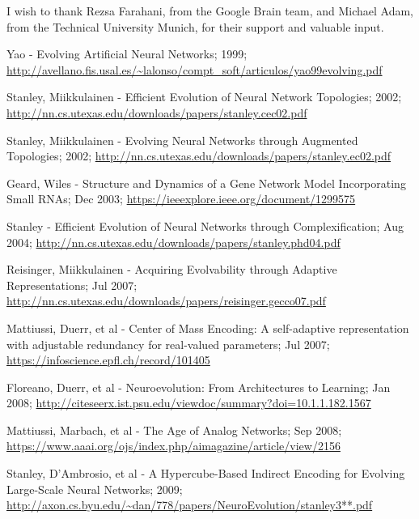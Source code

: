 \documentclass[journal, a4paper]{IEEEtran}
\begin{document}
I wish to thank Rezsa Farahani, from the Google Brain team, and Michael Adam, from the Technical University Munich, for their support and valuable input.




\begin{thebibliography}{5}

    Yao - Evolving Artificial Neural Networks; 1999;
    \url{http://avellano.fis.usal.es/~lalonso/compt_soft/articulos/yao99evolving.pdf}

    Stanley, Miikkulainen - Efficient Evolution of Neural Network Topologies; 2002;
    \url{http://nn.cs.utexas.edu/downloads/papers/stanley.cec02.pdf}

    Stanley, Miikkulainen - Evolving Neural Networks through Augmented Topologies; 2002;
    \url{http://nn.cs.utexas.edu/downloads/papers/stanley.ec02.pdf}

    Geard, Wiles - Structure and Dynamics of a Gene Network Model Incorporating Small RNAs; Dec 2003;
    \url{https://ieeexplore.ieee.org/document/1299575}

    Stanley - Efficient Evolution of Neural Networks through Complexification; Aug 2004;
    \url{http://nn.cs.utexas.edu/downloads/papers/stanley.phd04.pdf}

    Reisinger, Miikkulainen - Acquiring Evolvability through Adaptive Representations; Jul 2007;
    \url{http://nn.cs.utexas.edu/downloads/papers/reisinger.gecco07.pdf}

    Mattiussi, Duerr, et al - Center of Mass Encoding: A self-adaptive representation with adjustable redundancy for real-valued parameters; Jul 2007;
    \url{https://infoscience.epfl.ch/record/101405}

    Floreano, Duerr, et al - Neuroevolution: From Architectures to Learning; Jan 2008;
    \url{http://citeseerx.ist.psu.edu/viewdoc/summary?doi=10.1.1.182.1567}

    Mattiussi, Marbach, et al - The Age of Analog Networks; Sep 2008;
    \url{https://www.aaai.org/ojs/index.php/aimagazine/article/view/2156}

    Stanley, D’Ambrosio, et al - A Hypercube-Based Indirect Encoding for Evolving Large-Scale Neural Networks; 2009;
    \url{http://axon.cs.byu.edu/~dan/778/papers/NeuroEvolution/stanley3**.pdf}


\end{thebibliography}
\end{document}
